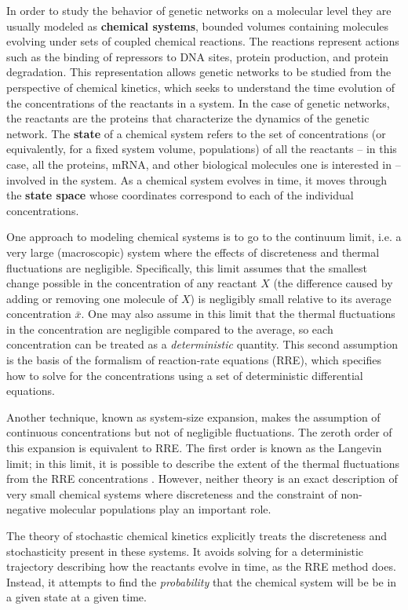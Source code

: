 \documentclass[english,letterpaper,12pt]{report}
\newcommand{\defkeywd}[1]{\textbf{#1}}
\begin{document}
\begin{doublespacing}
In order to study the behavior of genetic networks on a molecular level they are usually modeled as \defkeywd{chemical systems}, bounded volumes containing molecules evolving under sets of coupled chemical reactions. The reactions represent actions such as the binding of repressors to DNA sites, protein production, and protein degradation. This representation allows genetic networks to be studied from the perspective of chemical kinetics, which seeks to understand the time evolution of the concentrations of the reactants in a system. In the case of genetic networks, the reactants are the proteins that characterize the dynamics of the genetic network. The \defkeywd{state} of a chemical system refers to the set of concentrations (or equivalently, for a fixed system volume, populations) of all the reactants -- in this case, all the proteins, mRNA, and other biological molecules one is interested in -- involved in the system. As a chemical system evolves in time, it moves through the \defkeywd{state space} whose coordinates correspond to each of the individual concentrations.

One approach to modeling chemical systems is to go to the continuum limit, i.e. a very large (macroscopic) system where the effects of discreteness and thermal fluctuations are negligible. Specifically, this limit assumes that the smallest change possible in the concentration of any reactant $X$ (the difference caused by adding or removing one molecule of $X$) is negligibly small relative to its average concentration $\bar{x}$. One may also assume in this limit that the thermal fluctuations in the concentration are negligible compared to the average, so each concentration can be treated as a \emph{deterministic} quantity. This second assumption is the basis of the formalism of reaction-rate equations (RRE), which specifies how to solve for the concentrations using a set of deterministic differential equations. 

Another technique, known as system-size expansion, makes the assumption of continuous concentrations but not of negligible fluctuations. The zeroth order of this expansion is equivalent to RRE. The first order is known as the Langevin limit; in this limit, it is possible to describe the extent of the thermal fluctuations from the RRE concentrations \cite{langevin-limit}. However, neither theory is an exact description of very small chemical systems where discreteness and the constraint of non-negative molecular populations play an important role.

The theory of stochastic chemical kinetics explicitly treats the discreteness and stochasticity present in these systems. It avoids solving for a deterministic trajectory describing how the reactants evolve in time, as the RRE method does. Instead, it attempts to find the \emph{probability} that the chemical system will be be in a given state at a given time.


\end{doublespacing}
\end{document}
